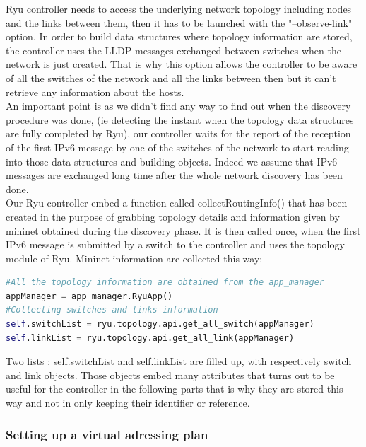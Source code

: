\documentclass{article}
\begin{document}
Ryu controller needs to access the underlying network topology
including nodes and the links between them, then it has to be launched
with the "--observe-link" option. In order to build data structures
where topology information are stored, the controller uses the LLDP
messages exchanged between switches when the network is just
created. That is why this option allows the controller to be aware of
all the switches of the network and all the links between then but it
can't retrieve any information about the hosts.\\
\newline
An important point is as we didn't find any way to find out when the
discovery procedure was done, (ie detecting the instant when the
topology data structures are fully completed by Ryu), our controller
waits for the report of the reception of the first IPv6 message by one
of the switches of the network to start reading into those data
structures and building objects. Indeed we assume that IPv6 messages
are exchanged long time after the whole network discovery has been
done.\\
\newline
Our Ryu controller embed a function called collectRoutingInfo() that
has been created in the purpose of grabbing topology details and
information given by mininet obtained during the discovery phase.  It
is then called once, when the first IPv6 message is submitted by a
switch to the controller and uses the topology module of Ryu. Mininet
information are collected this way:

\begin{lstlisting}[frame=single,language=Python,breaklines=true] 
#All the topology information are obtained from the app_manager
appManager = app_manager.RyuApp()
#Collecting switches and links information
self.switchList = ryu.topology.api.get_all_switch(appManager)
self.linkList = ryu.topology.api.get_all_link(appManager)
\end{lstlisting}

Two lists : self.switchList and self.linkList are filled up, with
respectively switch and link objects. Those objects embed many
attributes that turns out to be useful for the controller in the
following parts that is why they are stored this way and not in only
keeping their identifier or reference.

\subsubsection{Setting up a virtual adressing plan}
\end{document}

